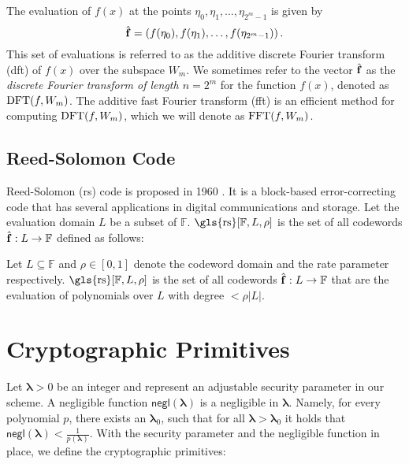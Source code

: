 \begin{definition}
	The evaluation of $f(x)$ at the points $\eta_0, \eta_1, \ldots, \eta_{2^m-1}$ is given by
	\begin{equation*}
		\hat{{\bf{f}}} = \left( f(\eta_0), f(\eta_1), \ldots, f(\eta_{2^m-1}) \right).
	\end{equation*}
	This set of evaluations is referred to as the additive discrete Fourier transform (\gls{dft}) of $f(x)$ over the subspace $W_m$. We sometimes refer to the vector $\hat{{\bf{f}}}$ as the \textit{discrete Fourier transform of length $n=2^m$} for the function $f(x)$, denoted as $\operatorname{DFT}(f, W_m)$. The additive fast Fourier transform (\gls{fft}) is an efficient method for computing $\operatorname{DFT}(f, W_m)$, which we will denote as $\operatorname{FFT}(f, W_m)$.
\end{definition}

\subsection{Reed-Solomon Code}

Reed-Solomon (\gls{rs}) code is proposed in 1960  \cite{rs-code}. It is a block-based error-correcting code that has several applications in digital communications and storage. Let the evaluation domain $L$  be a subset of $\mathbb{F}$. $\text{\gls{rs}}[\mathbb{F}, L, \rho]$ is the set of all codewords $\hat{{\bf{f}}}:L\rightarrow \mathbb{F}$ defined as follows: 


\begin{definition}\label{RScode} Let $L\subseteq\mathbb{F}$ and $\rho \in [0,1]$ denote the codeword domain and the rate parameter respectively. $\text{\gls{rs}}[\mathbb{F}, L, \rho]$ is the set of all codewords $\hat{{\bf{f}}}:L\rightarrow\mathbb{F}$ 
	that are the evaluation of polynomials over \(L\) with degree \( < \rho|L| \).
\end{definition}

\section{Cryptographic Primitives}
\label{sec:prel_Cryptographic Primitives}

Let $\boldsymbol{\lambda} > 0$ be an integer and represent an adjustable security parameter in our scheme. A negligible function $\mathsf{negl}(\boldsymbol{\lambda})$ is a negligible in $\boldsymbol{\lambda}$. Namely, for every polynomial $p$, there exists an $\boldsymbol{\lambda}_0$, such that for   all $\boldsymbol{\lambda} > \boldsymbol{\lambda}_0$ it holds that $\mathsf{negl}(\boldsymbol{\lambda})<\frac{1}{p(\boldsymbol{\lambda})}$. With the security parameter and the negligible function in place, we define the cryptographic primitives:

